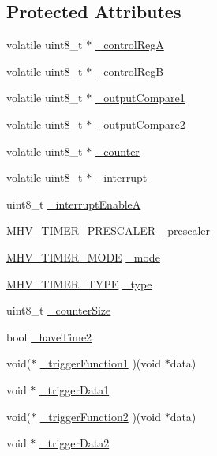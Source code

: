 \subsection*{\-Protected \-Attributes}
\begin{DoxyCompactItemize}
\item 
volatile uint8\-\_\-t $\ast$ \hyperlink{class_m_h_v___timer8_a2370aea351bfaed055c42b2ecfe6c930}{\-\_\-control\-Reg\-A}
\item 
volatile uint8\-\_\-t $\ast$ \hyperlink{class_m_h_v___timer8_ab713d8f3b71551b6146703d9ecfc5301}{\-\_\-control\-Reg\-B}
\item 
volatile uint8\-\_\-t $\ast$ \hyperlink{class_m_h_v___timer8_ab69320fb8fee00da797099aa633fdd92}{\-\_\-output\-Compare1}
\item 
volatile uint8\-\_\-t $\ast$ \hyperlink{class_m_h_v___timer8_a81be7741280c03ccfa31d22a20b5609b}{\-\_\-output\-Compare2}
\item 
volatile uint8\-\_\-t $\ast$ \hyperlink{class_m_h_v___timer8_ae99499e5828be6ed0c312cd43821a7c3}{\-\_\-counter}
\item 
volatile uint8\-\_\-t $\ast$ \hyperlink{class_m_h_v___timer8_a98e41d7d3ceef4b8fce11644ea110ee9}{\-\_\-interrupt}
\item 
uint8\-\_\-t \hyperlink{class_m_h_v___timer8_ad2fac7586dc6104b1c7323c84ba88559}{\-\_\-interrupt\-Enable\-A}
\item 
\hyperlink{_m_h_v___timer8_8h_a2e7ef9dbc200586bf55b0003896de599}{\-M\-H\-V\-\_\-\-T\-I\-M\-E\-R\-\_\-\-P\-R\-E\-S\-C\-A\-L\-E\-R} \hyperlink{class_m_h_v___timer8_a2d610b4bbd5aef2db6a4062dbd063aba}{\-\_\-prescaler}
\item 
\hyperlink{_m_h_v___timer8_8h_ae9de6a07a79f63ce9eeb6ba2bc9b053d}{\-M\-H\-V\-\_\-\-T\-I\-M\-E\-R\-\_\-\-M\-O\-D\-E} \hyperlink{class_m_h_v___timer8_a6f6b063d32d0778e8d1a91c561c79f13}{\-\_\-mode}
\item 
\hyperlink{_m_h_v___timer8_8h_aec9828462529f91a09d74c9abb33b611}{\-M\-H\-V\-\_\-\-T\-I\-M\-E\-R\-\_\-\-T\-Y\-P\-E} \hyperlink{class_m_h_v___timer8_a10c0fdfbbe901b923ea7fb1c0fc9690c}{\-\_\-type}
\item 
uint8\-\_\-t \hyperlink{class_m_h_v___timer8_a25827d35452ab31f1f0e1beb232a259b}{\-\_\-counter\-Size}
\item 
bool \hyperlink{class_m_h_v___timer8_adffeb4bbdd699814b5d0abd9cf59b3a9}{\-\_\-have\-Time2}
\item 
void($\ast$ \hyperlink{class_m_h_v___timer8_a0129830ac565811db27e07a31d635ec9}{\-\_\-trigger\-Function1} )(void $\ast$data)
\item 
void $\ast$ \hyperlink{class_m_h_v___timer8_a1e3fc760ea6b757afb648804750bca93}{\-\_\-trigger\-Data1}
\item 
void($\ast$ \hyperlink{class_m_h_v___timer8_a114593dd16cb46412e97c1e8a07bbc6c}{\-\_\-trigger\-Function2} )(void $\ast$data)
\item 
void $\ast$ \hyperlink{class_m_h_v___timer8_a4b78acf417bc2f051cdec4025c57d15b}{\-\_\-trigger\-Data2}
\end{DoxyCompactItemize}


